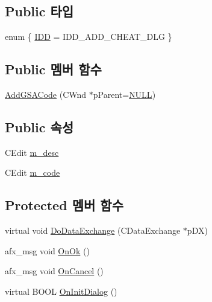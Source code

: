 \subsection*{Public 타입}
\begin{DoxyCompactItemize}
\item 
enum \{ \mbox{\hyperlink{class_add_g_s_a_code_ae09fbbcc1c447c677bf62ee2bcf7c945ade7716d104ed702a0c8cb0e4b61f64f4}{I\+DD}} = I\+D\+D\+\_\+\+A\+D\+D\+\_\+\+C\+H\+E\+A\+T\+\_\+\+D\+LG
 \}
\end{DoxyCompactItemize}
\subsection*{Public 멤버 함수}
\begin{DoxyCompactItemize}
\item 
\mbox{\hyperlink{class_add_g_s_a_code_adae37d67fa94fcd376ae11c6d9bd9d01}{Add\+G\+S\+A\+Code}} (C\+Wnd $\ast$p\+Parent=\mbox{\hyperlink{_system_8h_a070d2ce7b6bb7e5c05602aa8c308d0c4}{N\+U\+LL}})
\end{DoxyCompactItemize}
\subsection*{Public 속성}
\begin{DoxyCompactItemize}
\item 
C\+Edit \mbox{\hyperlink{class_add_g_s_a_code_a766cb9061a235616a856d3c1b16879db}{m\+\_\+desc}}
\item 
C\+Edit \mbox{\hyperlink{class_add_g_s_a_code_a0a4c3486121bd6be93e8f64215fea1ab}{m\+\_\+code}}
\end{DoxyCompactItemize}
\subsection*{Protected 멤버 함수}
\begin{DoxyCompactItemize}
\item 
virtual void \mbox{\hyperlink{class_add_g_s_a_code_a28d3f80ce066475e3d67e7fe62bb1f73}{Do\+Data\+Exchange}} (C\+Data\+Exchange $\ast$p\+DX)
\item 
afx\+\_\+msg void \mbox{\hyperlink{class_add_g_s_a_code_a857608ad314694d15ee6e811fb528d0b}{On\+Ok}} ()
\item 
afx\+\_\+msg void \mbox{\hyperlink{class_add_g_s_a_code_aa0db7ac66785e11cd5f614a06f7a11a2}{On\+Cancel}} ()
\item 
virtual B\+O\+OL \mbox{\hyperlink{class_add_g_s_a_code_af6ea2661ff2da964833f9e86f88cb1ff}{On\+Init\+Dialog}} ()
\end{DoxyCompactItemize}


